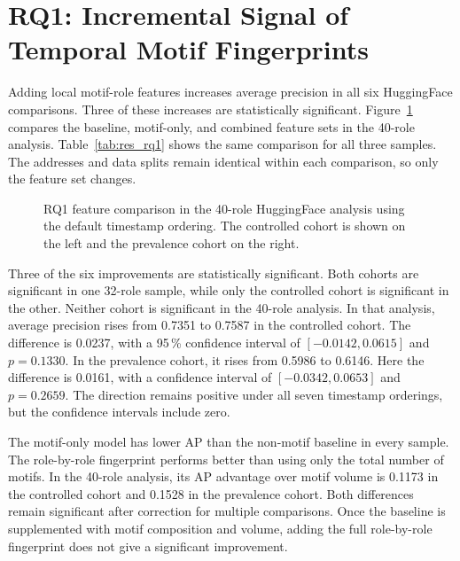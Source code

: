 \section{RQ1: Incremental Signal of Temporal Motif Fingerprints}

Adding local motif-role features increases average precision in all six
HuggingFace comparisons. Three of these increases are statistically significant.
Figure~\ref{fig:res_rq1_ablation} compares the baseline, motif-only, and combined
feature sets in the 40-role analysis. Table~\ref{tab:res_rq1} shows the same
comparison for all three samples. The addresses and data splits
remain identical within each comparison, so only the feature set changes.

\begin{figure}[ht]
  \centering
  \caption{RQ1 feature comparison in the 40-role HuggingFace analysis using the
  default timestamp ordering. The controlled cohort is shown on the left and
  the prevalence cohort on the right.}
  \label{fig:res_rq1_ablation}
\end{figure}


Three of the six improvements are statistically significant. Both cohorts are
significant in one 32-role sample, while only the controlled cohort is
significant in the other. Neither cohort is significant in the 40-role
analysis. In that analysis, average precision rises from 0.7351 to
0.7587 in the controlled cohort. The difference is 0.0237, with a 95\,\%
confidence interval of $[-0.0142,0.0615]$ and $p=0.1330$. In the prevalence
cohort, it rises from 0.5986 to 0.6146. Here the difference is 0.0161, with a
confidence interval of $[-0.0342,0.0653]$ and $p=0.2659$. The direction remains
positive under all seven timestamp orderings, but the confidence intervals
include zero.

The motif-only model has lower AP than the non-motif baseline in every
sample. The
role-by-role fingerprint performs better than using only the total number of
motifs. In the 40-role analysis, its AP advantage over motif volume is 0.1173 in
the controlled cohort and 0.1528 in the prevalence cohort. Both differences
remain significant after correction for multiple comparisons. Once the baseline
is supplemented with motif composition and volume, adding the full role-by-role
fingerprint does not give a significant improvement.


